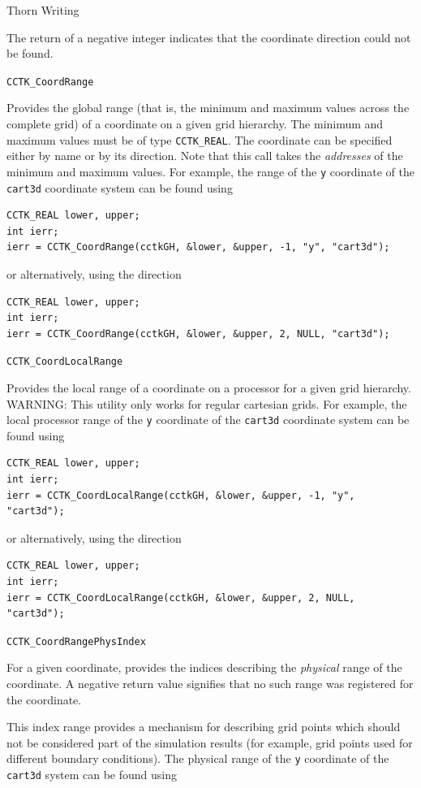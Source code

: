 \begin{cactuspart}{Thorn Writing}
\begin{Lentry}
The return of a negative integer indicates that the coordinate direction
could not be found.

\item[\texttt{CCTK\_CoordRange}]

Provides the global range (that is, the minimum and maximum values across
the complete grid) of a coordinate on a given grid hierarchy. The minimum and maximum values must be of type \texttt{CCTK\_REAL}. The
coordinate can be specified either by name or by its direction. Note that
this call takes the \emph{addresses} of the minimum and maximum values.
For example, the range of the \texttt{y} coordinate of the \texttt{cart3d}
coordinate system can be found using
%
\begin{verbatim}
CCTK_REAL lower, upper;
int ierr;
ierr = CCTK_CoordRange(cctkGH, &lower, &upper, -1, "y", "cart3d");
\end{verbatim}
or alternatively, using the direction
%
\begin{verbatim}
CCTK_REAL lower, upper;
int ierr;
ierr = CCTK_CoordRange(cctkGH, &lower, &upper, 2, NULL, "cart3d");
\end{verbatim}


\item[\texttt{CCTK\_CoordLocalRange}]

Provides the local range of a coordinate on a processor for a given
grid hierarchy. WARNING: This utility only works for regular
cartesian grids. For example, the local processor range of the
\texttt{y} coordinate of the \texttt{cart3d} coordinate system can be found using
%
\begin{verbatim}
CCTK_REAL lower, upper;
int ierr;
ierr = CCTK_CoordLocalRange(cctkGH, &lower, &upper, -1, "y", "cart3d");
\end{verbatim}
or alternatively, using the direction
%
\begin{verbatim}
CCTK_REAL lower, upper;
int ierr;
ierr = CCTK_CoordLocalRange(cctkGH, &lower, &upper, 2, NULL, "cart3d");
\end{verbatim}

\item[\texttt{CCTK\_CoordRangePhysIndex}]

For a given coordinate, provides the indices describing the \emph{physical}
range of the coordinate. A negative return value signifies that no such range
was registered for the coordinate.

This index range provides a mechanism for describing
grid points which should not be considered part of the simulation results (for example,
grid points used for different boundary conditions). The physical range of the
\texttt{y} coordinate of the \texttt{cart3d} system can be found using


\end{Lentry}
\end{cactuspart}
